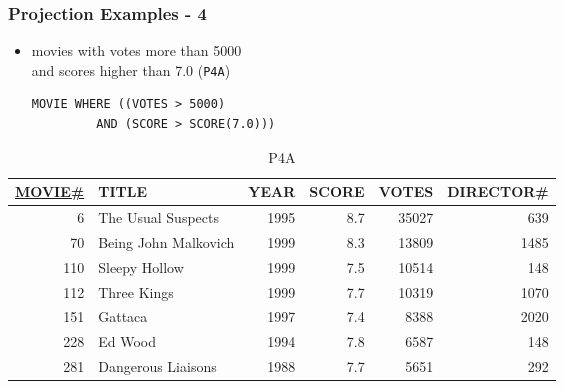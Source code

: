 \documentclass[dvipsnames]{beamer}
\theoremstyle{plain}
\begin{document}
\begin{frame}[fragile]
  \frametitle{Projection Examples - 4}

  \begin{itemize}
    \item movies with votes more than 5000\\
      and scores higher than 7.0 (\texttt{P4A})
    \begin{lstlisting}
MOVIE WHERE ((VOTES > 5000)
         AND (SCORE > SCORE(7.0)))
    \end{lstlisting}
  \end{itemize}

  \vspace{-10pt}
  \begin{tiny}
  \begin{table}
    \caption{P4A}
    \begin{tabular}{|r|l|r|r|r|r|}\hline
\underline{MOVIE\#} & TITLE & YEAR & SCORE & VOTES & DIRECTOR\#\\[2pt]\hline\hline
   6 & The Usual Suspects   & 1995 &   8.7 & 35027 &        639\\\hline
  70 & Being John Malkovich & 1999 &   8.3 & 13809 &       1485\\\hline
 110 & Sleepy Hollow        & 1999 &   7.5 & 10514 &        148\\\hline
 112 & Three Kings          & 1999 &   7.7 & 10319 &       1070\\\hline
 151 & Gattaca              & 1997 &   7.4 &  8388 &       2020\\\hline
 228 & Ed Wood              & 1994 &   7.8 &  6587 &        148\\\hline
 281 & Dangerous Liaisons   & 1988 &   7.7 &  5651 &        292\\\hline
    \end{tabular}
  \end{table}
  \end{tiny}
\end{frame}
\end{document}
